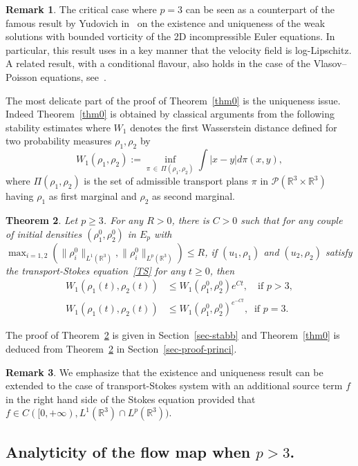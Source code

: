 \documentclass[10pt]{amsart}
\newtheorem{theo}{Theorem}[section]
\theoremstyle{definition}\newtheorem{defi}[theo]{Definition}\newtheorem{rema}[theo]{Remark}\newtheorem{exam}[theo]{Example}\newtheorem{exem}[theo]{Example}\newtheorem{nota}[theo]{Notation}
\newcommand{\R}{\mathbb{R}}
\newcommand{\clP}{\mathcal{P}}
\renewcommand{\leq}{\leqslant}
\renewcommand{\geq}{\geqslant}
\begin{document}
\begin{rema}\label{analog}
The critical case where $p=3$ can be seen as a counterpart of the famous result by Yudovich in~\cite{Yudovich63} on the existence and uniqueness of the weak solutions with bounded vorticity of the 2D incompressible Euler equations. In particular, this result uses in a key manner that the velocity field is log-Lipschitz. A related result, with a conditional flavour, also holds in the case of the Vlasov--Poisson equations, see~\cite{Loeper}.
\end{rema} The most delicate part of the proof of Theorem~\ref{thm0} is the uniqueness issue. Indeed Theorem~\ref{thm0} is obtained by classical arguments from the following stability estimates where $W_1$ denotes the first Wasserstein distance defined for two probability measures $\rho_1,\rho_2 $ by
\[
W_1 (\rho_1,\rho_2) :=
\underset{\pi\,\in\,\Pi(\rho_1,\rho_2)} \inf \int |x-y| d\pi(x,y),
\]
where $\Pi(\rho_1,\rho_2)$ is the set of admissible transport plans $\pi $ in $\clP(\R^3\times \R^3)$ having $\rho_1$ as first marginal and $\rho_2$ as second marginal.
\begin{theo} \label{thm}
Let $p\geq 3$. For any $R>0$, there is $C>0$ such that for any couple of initial densities $ (\rho_1^0, \rho_2^0)$ in $E_p $ with $ \max_{i=1,2} (\|\rho_i^0\|_{ L^1 (\R^3) },\|\rho_i^0\|_{ L^p (\R^3) }) \leq R$, if $ (u_1,\rho_1) $ and $ (u_2,\rho_2)$ satisfy the transport-Stokes equation~\eqref{TS} for any $t\geq 0$, then
\begin{align}
W_1(\rho_1(t),\rho_2(t)) &\leq W_1(\rho_1^0,\rho_2^0)e^{C t}, \quad \text{if } p > 3,\label{sta-geq-3}
\\ 
W_1 (\rho_1(t),\rho_2(t)) &\leq W_1(\rho_1^0,\rho_2^0)^{e^{-C t}}, \;\; \text{if } p = 3.\label{sta-geq-critik}
\end{align}
\end{theo}

The proof of Theorem~\ref{thm} is given in Section~\ref{sec-stabb} and Theorem~\ref{thm0} is deduced from Theorem~\ref{thm} in Section~\ref{sec-proof-princi}.

\begin{rema}\label{rem:TS_avec_terme_source}
We emphasize that the existence and uniqueness result can be extended to the case of transport-Stokes system with an additional source term $f$ in the right hand side of the Stokes equation provided that $f \in C([0,+\infty), L^1(\R^3) \cap L^p(\R^3))$.
\end{rema}


\subsection{Analyticity of the flow map when \texorpdfstring{$p > 3$}{p>3}.}
\end{document}
